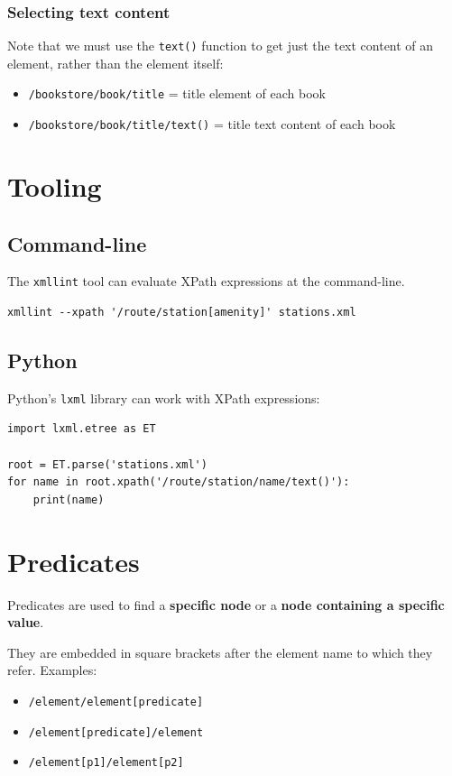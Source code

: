 \documentclass{pgnotes}
\begin{document}
\subsubsection{Selecting text content}

Note that we must use the \texttt{text()} function to get just the text content of an element, rather than the element itself:
\begin{itemize}
\item \texttt{/bookstore/book/title} = title element of each book
\item \texttt{/bookstore/book/title/text()} = title text content of each book
\end{itemize}

\section{Tooling}

\subsection{Command-line}

The \texttt{xmllint} tool can evaluate XPath expressions at the command-line.

\begin{verbatim}
xmllint --xpath '/route/station[amenity]' stations.xml
\end{verbatim}


\subsection{Python}

Python's \texttt{lxml} library can work with XPath expressions:
\begin{verbatim}
import lxml.etree as ET

root = ET.parse('stations.xml')
for name in root.xpath('/route/station/name/text()'):
    print(name)
\end{verbatim}



\section{Predicates}

Predicates are used to find a \textbf{specific node} or a \textbf{node containing a specific value}.

They are embedded in square brackets after the element name to which they refer.
Examples:
\begin{itemize}
\item \texttt{/element/element[predicate]}
\item \texttt{/element[predicate]/element}
\item \texttt{/element[p1]/element[p2]}
\end{itemize}
\end{document}
